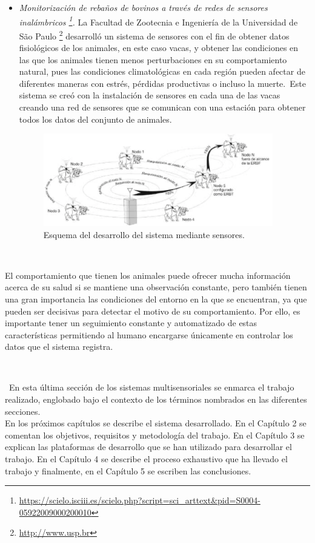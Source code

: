 \begin{itemize}
\item \textit{Monitorización de rebaños de bovinos a través de redes de sensores inalámbricos \footnote{\url{https://scielo.isciii.es/scielo.php?script=sci_arttext&pid=S0004-05922009000200010}}.} La Facultad de Zootecnia e Ingeniería de la Universidad de São Paulo \footnote{\url{http://www.usp.br}} desarrolló un sistema de sensores con el fin de obtener datos fisiológicos de los animales, en este caso vacas, y obtener las condiciones en las que los animales tienen menos perturbaciones en su comportamiento natural, pues las condiciones climatológicas en cada región pueden afectar de diferentes maneras con estrés, pérdidas productivas o incluso la muerte.\
Este sistema se creó con la instalación de sensores en cada una de las vacas creando una red de sensores que se comunican con una estación para obtener todos los datos del conjunto de animales.
\begin{figure} [h!]
  \begin{center}
    \includegraphics[width=10cm]{figs/saopaulo}
  \end{center}
  \caption{Esquema del desarrollo del sistema mediante sensores.}
  \label{fig:usao}
\end{figure}
\end{itemize}\

El comportamiento que tienen los animales puede ofrecer mucha información acerca de su salud si se mantiene una observación constante, pero también tienen una gran importancia las condiciones del entorno en la que se encuentran, ya que pueden ser decisivas para detectar el motivo de su comportamiento. Por ello, es importante tener un seguimiento constante y automatizado de estas características permitiendo al humano encargarse únicamente en controlar los datos que el sistema registra.
\

\

\
En esta última sección de los sistemas multisensoriales se enmarca el trabajo realizado, englobado bajo el contexto de los términos nombrados en las diferentes secciones.\\
En los próximos capítulos se describe el sistema desarrollado. En el Capítulo 2 se comentan los objetivos, requisitos y metodología del trabajo. En el Capítulo 3 se explican las plataformas de desarrollo que se han utilizado para desarrollar el trabajo. En el Capítulo 4 se describe el proceso exhaustivo que ha llevado el trabajo y finalmente, en el Capítulo 5 se escriben las conclusiones.

